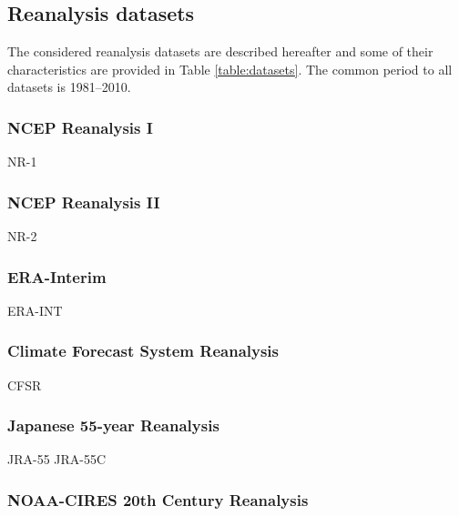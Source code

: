 \documentclass{ametsoc}
\begin{document}
\subsection{Reanalysis datasets}

The considered reanalysis datasets are described hereafter and some of their characteristics are provided in Table \ref{table:datasets}. The common period to all datasets is 1981--2010.

\subsubsection{NCEP Reanalysis I}

NR-1 \citep{Kalnay1996, Kistler2001}





\subsubsection{NCEP Reanalysis II}

NR-2 \citep{Kanamitsu2002}





\subsubsection{ERA-Interim}

ERA-INT \citep{Dee2011a}





\subsubsection{Climate Forecast System Reanalysis}

CFSR \citep{Saha2010a}





\subsubsection{Japanese 55-year Reanalysis}

JRA-55 \citep{Kobayashi2015, Harada2016}
JRA-55C




\subsubsection{NOAA-CIRES 20th Century Reanalysis}
\end{document}

